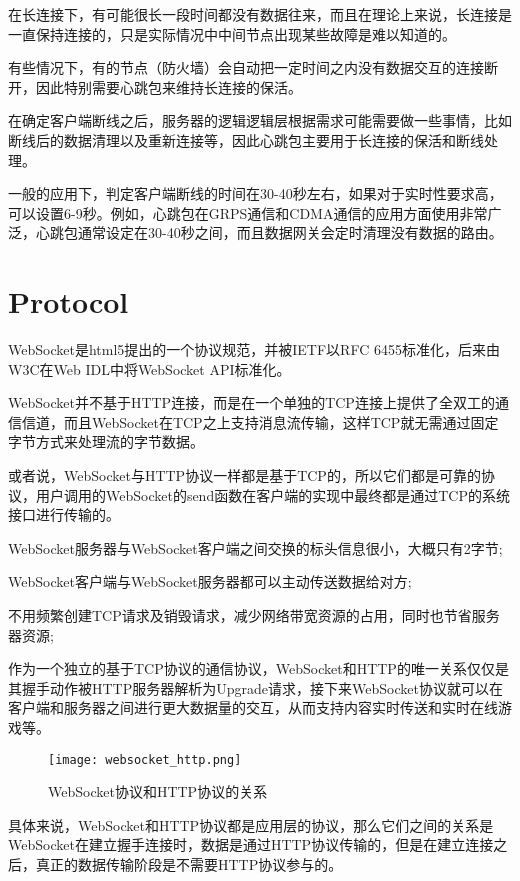 在长连接下，有可能很长一段时间都没有数据往来，而且在理论上来说，长连接是一直保持连接的，只是实际情况中中间节点出现某些故障是难以知道的。

有些情况下，有的节点（防火墙）会自动把一定时间之内没有数据交互的连接断开，因此特别需要心跳包来维持长连接的保活。

在确定客户端断线之后，服务器的逻辑逻辑层根据需求可能需要做一些事情，比如断线后的数据清理以及重新连接等，因此心跳包主要用于长连接的保活和断线处理。

一般的应用下，判定客户端断线的时间在30-40秒左右，如果对于实时性要求高，可以设置6-9秒。例如，心跳包在GRPS通信和CDMA通信的应用方面使用非常广泛，心跳包通常设定在30-40秒之间，而且数据网关会定时清理没有数据的路由。

\section{Protocol}

WebSocket是html5提出的一个协议规范，并被IETF以RFC 6455标准化，后来由W3C在Web IDL中将WebSocket API标准化。

WebSocket并不基于HTTP连接，而是在一个单独的TCP连接上提供了全双工的通信信道，而且WebSocket在TCP之上支持消息流传输，这样TCP就无需通过固定字节方式来处理流的字节数据。

或者说，WebSocket与HTTP协议一样都是基于TCP的，所以它们都是可靠的协议，用户调用的WebSocket的send函数在客户端的实现中最终都是通过TCP的系统接口进行传输的。

\begin{compactitem}
\item WebSocket服务器与WebSocket客户端之间交换的标头信息很小，大概只有2字节;
\item WebSocket客户端与WebSocket服务器都可以主动传送数据给对方;
\item 不用频繁创建TCP请求及销毁请求，减少网络带宽资源的占用，同时也节省服务器资源;
\end{compactitem}

作为一个独立的基于TCP协议的通信协议，WebSocket和HTTP的唯一关系仅仅是其握手动作被HTTP服务器解析为Upgrade请求，接下来WebSocket协议就可以在客户端和服务器之间进行更大数据量的交互，从而支持内容实时传送和实时在线游戏等。

\begin{figure}[htbp]
\centering
\texttt{[image: websocket\_http.png]}
\caption{WebSocket协议和HTTP协议的关系}
\end{figure}

具体来说，WebSocket和HTTP协议都是应用层的协议，那么它们之间的关系是WebSocket在建立握手连接时，数据是通过HTTP协议传输的，但是在建立连接之后，真正的数据传输阶段是不需要HTTP协议参与的。

